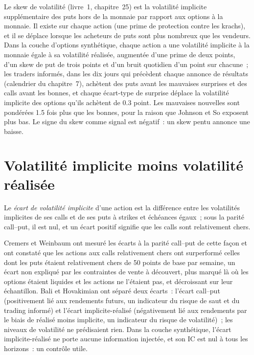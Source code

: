 Le skew de volatilité (livre~1, chapitre~25) est la volatilité implicite supplémentaire des puts hors de la monnaie par rapport aux options à la monnaie. Il existe sur chaque action (une
prime de protection contre les krachs), et il se déplace lorsque les acheteurs de puts sont plus nombreux que les vendeurs. Dans la couche d'options synthétique, chaque action a une volatilité implicite à la monnaie
égale à sa volatilité réalisée, augmentée d'une prime de deux points, d'un skew de put de trois points et d'un bruit quotidien d'un point sur chacune~; les traders informés,
dans les dix jours qui précèdent chaque annonce de résultats (calendrier du chapitre~7), achètent des puts avant les mauvaises surprises et des calls avant les bonnes, et chaque
écart-type de surprise déplace la volatilité implicite des options qu'ils achètent de 0.3 point. Les mauvaises nouvelles sont pondérées 1.5 fois plus que les bonnes, pour la raison
que Johnson et So exposent plus bas. Le signe du skew comme signal est négatif~: un skew pentu annonce une baisse.

\section{Volatilité implicite moins volatilité réalisée}

\begin{definition}\label{def:s1:options-implied-signals-for-stocks:spread}
Le \emph{écart de volatilité implicite} d'une action est la différence entre les volatilités implicites de ses calls et de ses puts à
strikes et échéances égaux~; sous la parité call--put, il est nul, et un écart positif signifie que les calls sont relativement chers.
\end{definition}

Cremers et Weinbaum ont mesuré les écarts à la parité call--put de cette façon et ont constaté que les actions aux calls relativement chers ont surperformé celles
dont les puts étaient relativement chers de 50 points de base par semaine, un écart non expliqué par les contraintes de vente à découvert, plus marqué là où les options étaient liquides et les actions ne l'étaient pas, et
décroissant sur leur échantillon. Bali et Hovakimian ont séparé deux écarts~: l'écart call--put (positivement lié aux rendements futurs, un indicateur du risque de saut et du
trading informé) et l'écart implicite-réalisé (négativement lié aux rendements par le biais de réalisé moins implicite, un indicateur du risque de volatilité)~;
les niveaux de volatilité ne prédisaient rien. Dans la couche synthétique, l'écart implicite-réalisé ne porte aucune information injectée, et son IC est nul à tous les horizons~:
un contrôle utile.

